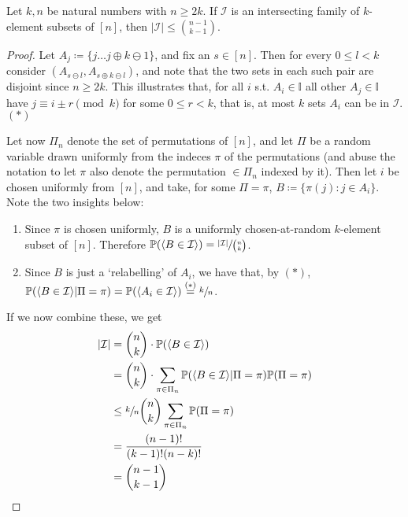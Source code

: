 			\begin{theorem}
				Let $k,n$ be natural numbers with $n \geq 2k$. If $\mathcal{I}$ is an intersecting family of 
				$k$-element subsets of $[n]$, then $|\mathcal{I}| \leq \binom{n-1}{k-1}$.
			\end{theorem}
			\begin{proof}
				Let $A_j \coloneqq \{j \hdots j \oplus k \ominus 1\}$, and fix an $s \in [n]$. Then for every
				$0 \leq l < k$ consider $(A_{s\ominus l}, A_{s\oplus k\ominus l})$, and note that the two sets in 
				each such pair are disjoint since $n \geq 2k$. This illustrates that, for all $i$ s.t. $A_i \in 
				\mathbb{I}$ all other $A_j \in \mathbb{I}$ have $j \equiv i \pm r \pmod{k}$ for some $0 \leq 
				r < k$, that is, at most $k$ sets $A_i$ can be in $\mathcal{I}$. $(*)$ \par
				Let now $\Pi_n$ denote the set of permutations of $[n]$, and let $\Pi$ be a random variable drawn 
				uniformly from the indeces $\pi$ of the permutations (and abuse the notation to let $\pi$ also denote 
				the permutation $\in \Pi_n$ indexed by it). Then let $i$ be chosen uniformly from $[n]$, and take, 
				for some $\Pi = \pi$, $ B \coloneqq \{\pi(j) : j \in A_i\}$. Note the two insights below:
				\begin{enumerate}
					\item Since $\pi$ is chosen uniformly, $B$ is a uniformly chosen-at-random $k$-element subset
					of $[n]$. Therefore $\mathbb{P}(\langle B \in \mathcal{I} \rangle) = 
					\sfrac{|\mathcal{I}|}{\binom{n}{k}}$.
					\item Since $B$ is just a `relabelling' of $A_i$, we have that, by $(*)$, 
					$\mathbb{P}(\langle B \in \mathcal{I} \rangle | \Pi = \pi) = \mathbb{P}(\langle A_i \in 
					\mathcal{I} \rangle) \stackrel{(*)}{=} \sfrac{k}{n}$.
				\end{enumerate}
				If we now combine these, we get
				\begin{align*}
					|\mathcal{I}| &= \binom{n}{k} \cdot \mathbb{P}(\langle B \in \mathcal{I}\rangle) \\
					              &= \binom{n}{k} \cdot \sum_{\pi \in \Pi_n} \mathbb{P}(\langle B \in 
						      \mathcal{I}\rangle | \Pi = \pi) \mathbb{P}(\Pi = \pi)\\
						      &\leq \sfrac{k}{n} \binom{n}{k} \sum_{\pi \in \Pi_n} \mathbb{P}(\Pi = \pi)\\
						      &= \frac{(n-1)!}{(k-1)!(n-k)!} \\
						      &= \binom{n-1}{k-1}
				\end{align*}
			\end{proof}
